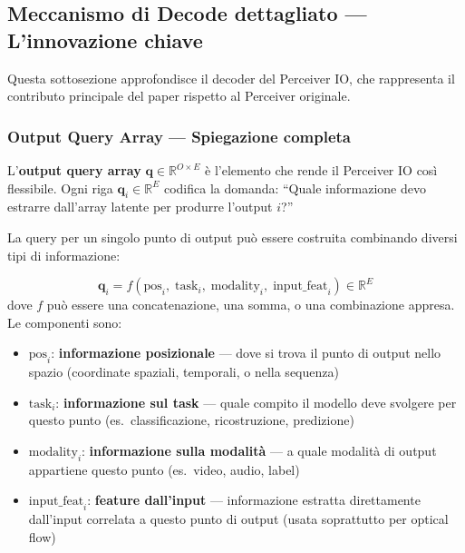 \documentclass[12pt,a4paper]{article}
\begin{document}
\subsection{Meccanismo di Decode dettagliato --- L'innovazione chiave}

Questa sottosezione approfondisce il decoder del Perceiver IO, che rappresenta il contributo principale del paper rispetto al Perceiver originale.

\subsubsection{Output Query Array --- Spiegazione completa}

L'\textbf{output query array} $\mathbf{q} \in \mathbb{R}^{O \times E}$ \`e l'elemento che rende il Perceiver IO cos\`i flessibile. Ogni riga $\mathbf{q}_i \in \mathbb{R}^E$ codifica la domanda: ``Quale informazione devo estrarre dall'array latente per produrre l'output $i$?''

La query per un singolo punto di output pu\`o essere costruita combinando diversi tipi di informazione:

\begin{formulabox}
\[
\mathbf{q}_i = f\!\left(\text{pos}_i, \; \text{task}_i, \; \text{modality}_i, \; \text{input\_feat}_i\right) \in \mathbb{R}^E
\]
dove $f$ pu\`o essere una concatenazione, una somma, o una combinazione appresa. Le componenti sono:
\begin{itemize}
    \item $\text{pos}_i$: \textbf{informazione posizionale} --- dove si trova il punto di output nello spazio (coordinate spaziali, temporali, o nella sequenza)
    \item $\text{task}_i$: \textbf{informazione sul task} --- quale compito il modello deve svolgere per questo punto (es.\ classificazione, ricostruzione, predizione)
    \item $\text{modality}_i$: \textbf{informazione sulla modalit\`a} --- a quale modalit\`a di output appartiene questo punto (es.\ video, audio, label)
    \item $\text{input\_feat}_i$: \textbf{feature dall'input} --- informazione estratta direttamente dall'input correlata a questo punto di output (usata soprattutto per optical flow)
\end{itemize}
\end{formulabox}
\end{document}
